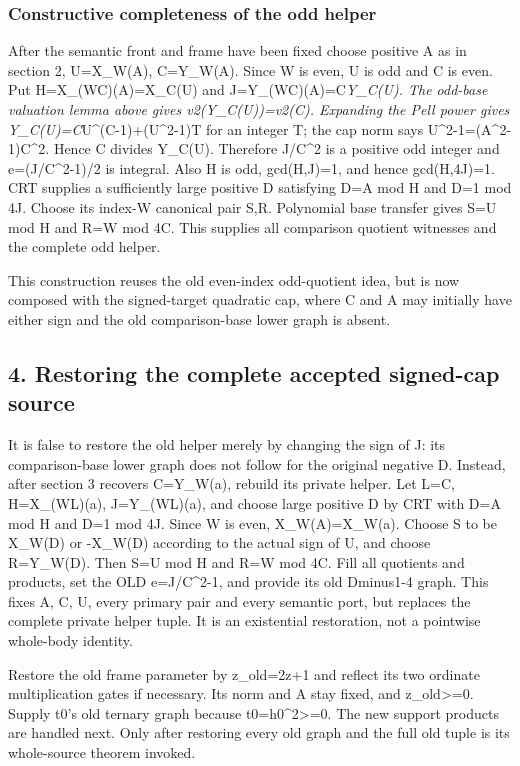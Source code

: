 \subsubsection{Constructive completeness of the odd
helper}\label{constructive-completeness-of-the-odd-helper}

After the semantic front and frame have been fixed choose positive A as
in section 2, U=X\_W(A), C=Y\_W(A). Since W is even, U is odd and C is
even. Put H=X\_(WC)(A)=X\_C(U) and J=Y\_(WC)(A)=C\emph{Y\_C(U). The
odd-base valuation lemma above gives v2(Y\_C(U))=v2(C). Expanding the
Pell power gives Y\_C(U)=C}U\^{}(C-1)+(U\^{}2-1)T for an integer T; the
cap norm says U\^{}2-1=(A\^{}2-1)C\^{}2. Hence C divides Y\_C(U).
Therefore J/C\^{}2 is a positive odd integer and e=(J/C\^{}2-1)/2 is
integral. Also H is odd, gcd(H,J)=1, and hence gcd(H,4J)=1. CRT supplies
a sufficiently large positive D satisfying D=A mod H and D=1 mod 4J.
Choose its index-W canonical pair S,R. Polynomial base transfer gives
S=U mod H and R=W mod 4C. This supplies all comparison quotient
witnesses and the complete odd helper.

This construction reuses the old even-index odd-quotient idea, but is
now composed with the signed-target quadratic cap, where C and A may
initially have either sign and the old comparison-base lower graph is
absent.

\subsection{4. Restoring the complete accepted signed-cap
source}\label{restoring-the-complete-accepted-signed-cap-source}

It is false to restore the old helper merely by changing the sign of J:
its comparison-base lower graph does not follow for the original
negative D. Instead, after section 3 recovers
\textbar C\textbar=Y\_W(a), rebuild its private helper. Let
L=\textbar C\textbar, H=X\_(WL)(a), J=Y\_(WL)(a), and choose large
positive D by CRT with D=A mod H and D=1 mod 4J. Since W is even,
X\_W(A)=X\_W(a). Choose S to be X\_W(D) or -X\_W(D) according to the
actual sign of U, and choose R=Y\_W(D). Then S=U mod H and R=W mod 4C.
Fill all quotients and products, set the OLD e=J/C\^{}2-1, and provide
its old Dminus1-4 graph. This fixes A, C, U, every primary pair and
every semantic port, but replaces the complete private helper tuple. It
is an existential restoration, not a pointwise whole-body identity.

Restore the old frame parameter by z\_old=\textbar2z+1 and
reflect its two ordinate multiplication gates if necessary. Its norm and
A stay fixed, and z\_old\textgreater=0. Supply t0's old ternary graph
because t0=h0\^{}2\textgreater=0. The new support products are handled
next. Only after restoring every old graph and the full old tuple is its
whole-source theorem invoked.

